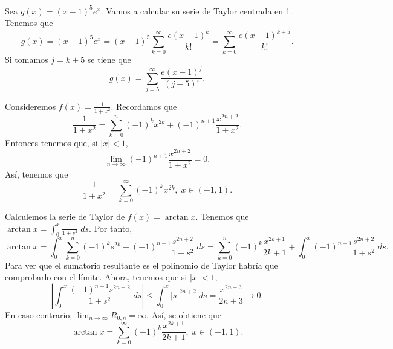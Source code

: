\begin{eg}
\normalfont Sea $\displaystyle g\left(x\right) = \left(x-1\right)^{5}e^{x} $. Vamos a calcular su serie de Taylor centrada en 1. Tenemos que 
\[g\left(x\right) = \left(x-1\right)^{5}e^{x} = \left(x-1\right)^{5}\sum^{\infty}_{k = 0}\frac{e\left(x-1\right)^{k}}{k!} = \sum^{\infty}_{k=0}\frac{e\left(x-1\right)^{k+5}}{k!} .\]
Si tomamos $\displaystyle j= k + 5 $ se tiene que 
\[g\left(x\right)=\sum^{\infty}_{j=5}\frac{e\left(x-1\right)^{j}}{\left(j-5\right)!} .\]
\end{eg}
\begin{eg}
\normalfont Consideremos $\displaystyle f\left(x\right) = \frac{1}{1 + x^{2}} $. Recordamos que
\[ \frac{1}{1 + x^{2}} = \sum^{n}_{k=0}\left(-1\right)^{k}x^{2k} + \left(-1\right)^{n+1}\frac{x^{2n+2}}{1+x^{2}} .\]
Entonces tenemos que, si $\displaystyle \left|x\right| < 1 $,
\[\lim_{n \to \infty}\left(-1\right)^{n+1}\frac{x^{2n+2}}{1+x^{2}} = 0.\]
Así, tenemos que 
\[\frac{1}{1 + x^{2}} = \sum^{\infty}_{k=0}\left(-1\right)^{k}x^{2k}, \; x \in \left(-1,1\right) .\]
\end{eg}
\begin{eg}
\normalfont Calculemos la serie de Taylor de $\displaystyle f\left(x\right) = \arctan x $. Tenemos que $\displaystyle \arctan x = \int^{x}_{0} \frac{1}{1 + s^{2}} \; d s $. Por tanto,
\[\arctan x = \int^{x}_{0} \sum^{n}_{k=0}\left(-1\right)^{k}s^{2k} + \left(-1\right)^{n+1}\frac{s^{2n+2}}{1+s^{2}} \; d s = \sum^{n}_{k=0}\left(-1\right)^{k}\frac{x^{2k+1}}{2k+1} + \int^{x}_{0} \left(-1\right)^{n+1}\frac{s^{2n+2}}{1+s^{2}} \; d s .\]
Para ver que el sumatorio resultante es el polinomio de Taylor habría que comprobarlo con el límite. Ahora, tenemos que si $\displaystyle \left|x\right| < 1 $,
\[ \left|\int^{x}_{0} \frac{\left(-1\right)^{n+1}s^{2n+2}}{1+s^{2}} \; d s\right| \leq \int^{x}_{0} \left|s\right|^{2n+2} \; d s = \frac{x^{2n+3}}{2n+3} \to 0.\]
En caso contrario, $\displaystyle \lim_{n \to \infty}R_{0,n} = \infty $. Así, se obtiene que 
\[\arctan x = \sum^{\infty}_{k=0}\left(-1\right)^{k}\frac{x^{2k+1}}{2k+1}, \; x \in \left(-1,1\right) .\]
\end{eg}
